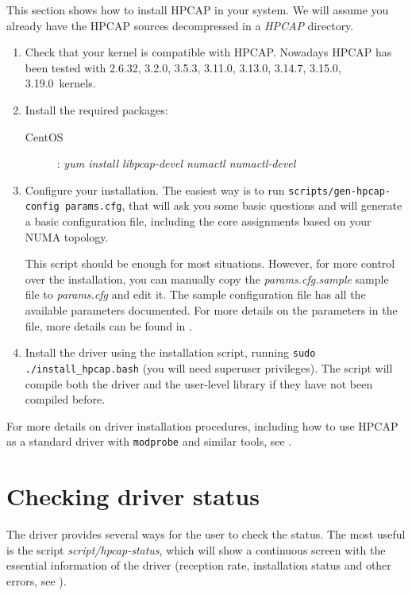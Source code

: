 \documentclass[a4paper,oneside]{hpman}
\newcommand{\supportedkernels}{2.6.32, 3.2.0, 3.5.3, 3.11.0, 3.13.0, 3.14.7, 3.15.0, 3.19.0}
\begin{document}
This section shows how to install HPCAP in your system. We will assume you already have the HPCAP sources decompressed in a \textit{HPCAP} directory.

\begin{enumerate}
\item Check that your kernel is compatible with HPCAP. Nowadays HPCAP has been tested with \supportedkernels\ kernels.

\item Install the required packages:
\begin{description}
\item[CentOS]: \textit{yum install libpcap-devel numactl numactl-devel}
\end{description}

\item Configure your installation. The easiest way is to run \texttt{scripts/gen-hpcap-config params.cfg}, that will ask you some basic questions and will generate a basic configuration file, including the core assignments based on your NUMA topology.
\vspace{2pt}

This script should be enough for most situations. However, for more control over the installation, you can manually copy the \textit{params.cfg.sample} sample file to \textit{params.cfg} and edit it. The sample configuration file has all the available parameters documented. For more details on the parameters in the file, more details can be found in .

\item Install the driver using the installation script, running \texttt{sudo ./install\_hpcap.bash} (you will need superuser privileges). The script will compile both the driver and the user-level library if they have not been compiled before.
\end{enumerate}

For more details on driver installation procedures, including how to use HPCAP as a standard driver with \texttt{modprobe} and similar tools, see .

\section{Checking driver status}
\label{sec:QuickStatus}

The driver provides several ways for the user to check the status. The most useful is the script \textit{script/hpcap-status}, which will show a continuous screen with the essential information of the driver (reception rate, installation status and other errors, see ).
\end{document}

